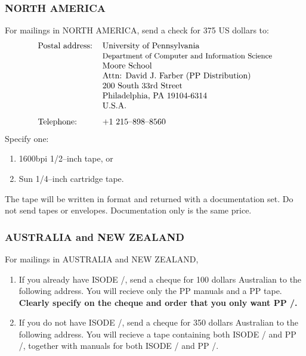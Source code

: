 \subsubsection*{NORTH AMERICA}
For mailings in NORTH AMERICA,
send a check for 375 US dollars to:
\[\begin{tabular}{ll}
Postal address:&University of Pennsylvania\\
&               \small Department of Computer and Information Science\\
&               Moore School\\
&               Attn: David J. Farber (PP Distribution)\\
&               200 South 33rd Street\\
&               Philadelphia, PA 19104-6314\\
&               U.S.A.\\[0.1in]
Telephone:&     +1 215--898--8560
\end{tabular}\]
Specify one:
\begin{enumerate}
\item   1600bpi 1/2--inch tape, or

\item   Sun 1/4--inch cartridge tape.
\end{enumerate}
The tape will be written in  format and returned with
a documentation set.
Do not send tapes or envelopes.
Documentation only is the same price.


\subsubsection*{AUSTRALIA and NEW ZEALAND}
For mailings in AUSTRALIA and NEW ZEALAND,

\begin{enumerate}
\item If you already have ISODE \isodevrsn/, send a cheque for 100
        dollars Australian to the following address. You will
        recieve only the PP manuals and a PP tape. {\bf Clearly specify
        on the cheque and order that you only want PP \ppversion/.}
\item	If you do not have ISODE \isodevrsn/, send a cheque for 350
        dollars Australian to the following address. You will
        recieve a tape containing both ISODE \isodevrsn/ and PP
	\ppversion/, together 
        with manuals for both ISODE \isodevrsn/ and PP \ppversion/.
\end{enumerate}

